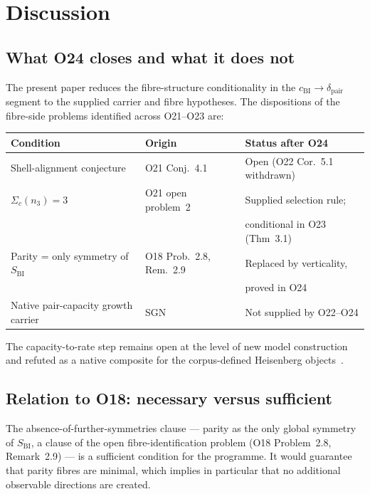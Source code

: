 \documentclass[11pt,a4paper]{article}
\newcommand{\dpair}{\delta_{\mathrm{pair}}}
\newcommand{\SBI}{S_{\mathrm{BI}}}
\newcommand{\cchi}{c_{\mathrm{BI}}}
\begin{document}
  \section{Discussion}
  \label{sec:discussion}

  \subsection{What O24 closes and what it does not}
    \label{sec:closes}

    The present paper reduces the fibre-structure conditionality in the
    $\cchi \to \dpair$ segment to the supplied carrier and fibre hypotheses.
    The dispositions of the fibre-side problems identified across O21--O23 are:

    \begin{center}
      \begin{tabular}{lll}
        \hline
        Condition & Origin & Status after O24 \\
        \hline
        Shell-alignment conjecture & O21 Conj.~4.1 & Open (O22 Cor.~5.1 withdrawn) \\
        $\Sigma_c(n_3) = 3$ & O21 open problem~2 & Supplied selection rule; \\
        & & conditional in O23 (Thm~3.1) \\
        Parity = only symmetry of $\SBI$ & O18 Prob.~2.8, Rem.~2.9 & Replaced by verticality, \\
        & & proved in O24 \\
        Native pair-capacity growth carrier & SGN & Not supplied by O22--O24 \\
        \hline
      \end{tabular}
    \end{center}

    The capacity-to-rate step remains open at the level of new model construction and refuted as
    a native composite for the corpus-defined Heisenberg objects~\cite{Beau2026sgn}.

  \subsection{Relation to O18: necessary versus sufficient}
    \label{sec:o18relation}

    The absence-of-further-symmetries clause --- parity as the only global symmetry of $\SBI$,
    a clause of the open fibre-identification problem (O18 Problem~2.8, Remark~2.9) --- is a
    sufficient condition for the programme.
    It would guarantee that parity fibres are minimal, which implies in particular that no
    additional observable directions are created.
\end{document}
